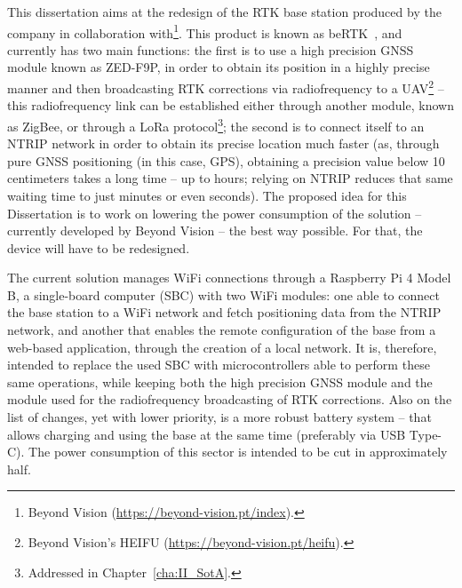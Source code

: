 This dissertation aims at the redesign of the RTK base station produced by the company in collaboration with\footnote{Beyond Vision (\url{https://beyond-vision.pt/index}).}. This product is known as beRTK\textsuperscript{\textregistered}~\cite{beRTK_2022}, and currently has two main functions: the first is to use a high precision GNSS module known as ZED-F9P, in order to obtain its position in a highly precise manner and then broadcasting RTK corrections via radiofrequency to a UAV\footnote{Beyond Vision's HEIFU\textsuperscript{\textregistered} (\url{https://beyond-vision.pt/heifu}).} -- this radiofrequency link can be established either through another module, known as ZigBee, or through a LoRa protocol\footnote{Addressed in Chapter~\ref{cha:II_SotA}.};
the second is to connect itself to an NTRIP network in order to obtain its precise location much faster (as, through pure GNSS positioning (in this case, GPS), obtaining a precision value below 10 centimeters takes a long time -- up to hours; relying on NTRIP reduces that same waiting time to just minutes or even seconds).
The proposed idea for this Dissertation is to work on lowering the power consumption of the solution -- currently developed by Beyond Vision -- the best way possible. For that, the device will have to be redesigned.

The current solution manages WiFi connections through a Raspberry Pi 4 Model B, a single-board computer (SBC) with two WiFi modules:
one able to connect the base station to a WiFi network and fetch positioning data from the NTRIP network, and another that enables the remote configuration of the base from a web-based application, through the creation of a local network.
It is, therefore, intended to replace the used SBC with microcontrollers able to perform these same operations, while keeping both the high precision GNSS module and the module used for the radiofrequency broadcasting of RTK corrections.
Also on the list of changes, yet with lower priority, is a more robust battery system -- that allows charging and using the base at the same time (preferably via USB Type-C). The power consumption of this sector is intended to be cut in approximately half.
